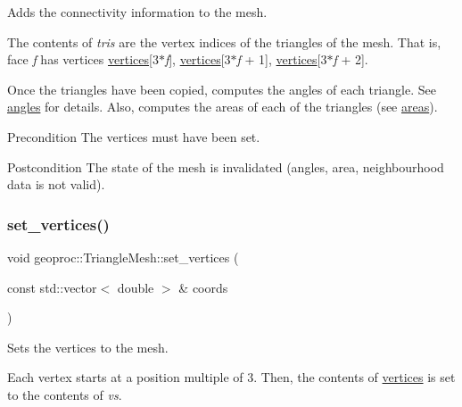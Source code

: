 Adds the connectivity information to the mesh. 

The contents of {\itshape tris} are the vertex indices of the triangles of the mesh. That is, face {\itshape f} has vertices \hyperlink{classgeoproc_1_1TriangleMesh_a72052fc497d349c48966b937e5e3e834}{vertices}\mbox{[}3$\ast${\itshape f}\mbox{]}, \hyperlink{classgeoproc_1_1TriangleMesh_a72052fc497d349c48966b937e5e3e834}{vertices}\mbox{[}3$\ast${\itshape f} + 1\mbox{]}, \hyperlink{classgeoproc_1_1TriangleMesh_a72052fc497d349c48966b937e5e3e834}{vertices}\mbox{[}3$\ast${\itshape f} + 2\mbox{]}.

Once the triangles have been copied, computes the angles of each triangle. See \hyperlink{classgeoproc_1_1TriangleMesh_a50b5456f546551aa39d68487614d7720}{angles} for details. Also, computes the areas of each of the triangles (see \hyperlink{classgeoproc_1_1TriangleMesh_a134859a7251c2ae7c8b64b2e44e8ad0e}{areas}).

\begin{DoxyPrecond}{Precondition}
The vertices must have been set. 
\end{DoxyPrecond}
\begin{DoxyPostcond}{Postcondition}
The state of the mesh is invalidated (angles, area, neighbourhood data is not valid). 
\end{DoxyPostcond}
\mbox{\label{classgeoproc_1_1TriangleMesh_acdee6975fe8d504956211a154adbf77c}} 
\subsubsection{\texorpdfstring{set\+\_\+vertices()}{set\_vertices()}\hspace{0.1cm}{\footnotesize\ttfamily [1/3]}}
{\footnotesize\ttfamily void geoproc\+::\+Triangle\+Mesh\+::set\+\_\+vertices (\begin{DoxyParamCaption}\item[{const std\+::vector$<$ double $>$ \&}]{coords }\end{DoxyParamCaption})}



Sets the vertices to the mesh. 

Each vertex starts at a position multiple of 3. Then, the contents of \hyperlink{classgeoproc_1_1TriangleMesh_a72052fc497d349c48966b937e5e3e834}{vertices} is set to the contents of {\itshape vs}.

